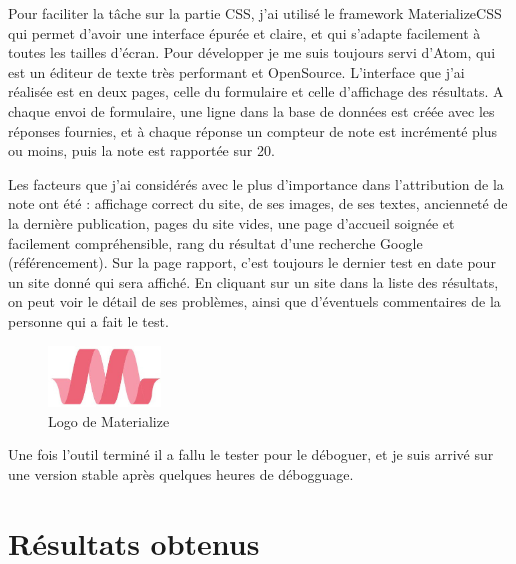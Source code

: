 \documentclass[report]{tnreport}
\begin{document}
Pour faciliter la tâche sur la partie CSS, j’ai utilisé le framework MaterializeCSS qui permet d’avoir une interface épurée et claire, et qui s’adapte facilement à toutes les tailles d’écran. 
Pour développer je me suis toujours servi d’Atom, qui est un éditeur de texte très performant et OpenSource.
L’interface que j’ai réalisée est en deux pages, celle du formulaire et celle d’affichage des résultats. 
A chaque envoi de formulaire, une ligne dans la base de données est créée avec les réponses fournies, et à chaque réponse un compteur de note est incrémenté plus ou moins, puis la note est rapportée sur 20. 


Les facteurs que j’ai considérés avec le plus d’importance dans l’attribution de la note ont été : affichage correct du site, de ses images, de ses textes, ancienneté de la dernière publication, pages du site vides, une page d’accueil soignée et facilement compréhensible, rang du résultat d’une recherche Google (référencement).
Sur la page rapport, c’est toujours le dernier test en date pour un site donné qui sera affiché. En cliquant sur un site dans la liste des résultats, on peut voir le détail de ses problèmes, ainsi que d’éventuels commentaires de la personne qui a fait le test.
\begin{figure}
  \centering
  \includegraphics[width=3cm]{figures/materialize}
  \caption{Logo de Materialize}
  \label{fig:logo-materialize}
\end{figure}

Une fois l’outil terminé il a fallu le tester pour le déboguer, et je suis arrivé sur une version stable après quelques heures de débogguage.


\section{Résultats obtenus}
\end{document}

